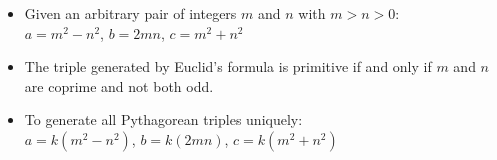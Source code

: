\begin{itemize}
\item Given an arbitrary pair of integers $m$ and $n$ with $m > n > 0$:\\
$a = m^2 - n^2$, $b = 2mn$, $c = m^2 + n^2$
\item The triple generated by Euclid's formula is primitive if and only if $m$ and $n$ are coprime and not both odd.
\item To generate all Pythagorean triples uniquely:\\
$a = k (m^2 - n^2)$, $b = k(2mn)$, $c = k(m^2 + n^2)$
\end{itemize}